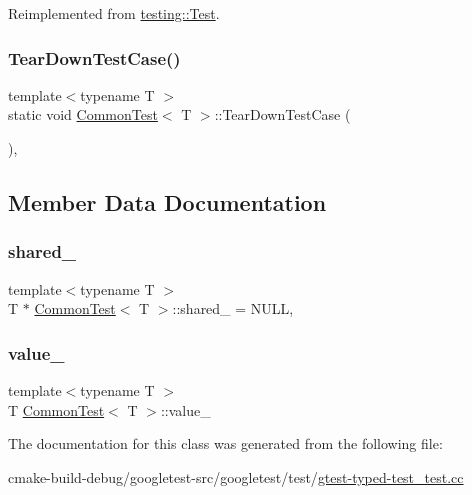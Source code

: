 Reimplemented from \mbox{\hyperlink{classtesting_1_1Test_a5f0ab439802cbe0ef7552f1a9f791923}{testing\+::\+Test}}.

\mbox{\label{classCommonTest_a68d2bf5108cf28478331588fbdff4838}} 
\subsubsection{\texorpdfstring{TearDownTestCase()}{TearDownTestCase()}}
{\footnotesize\ttfamily template$<$typename T $>$ \\
static void \mbox{\hyperlink{classCommonTest}{Common\+Test}}$<$ T $>$\+::Tear\+Down\+Test\+Case (\begin{DoxyParamCaption}{ }\end{DoxyParamCaption})\hspace{0.3cm}{\ttfamily [inline]}, {\ttfamily [static]}}



\subsection{Member Data Documentation}
\mbox{\label{classCommonTest_a52368ce1e65a865db9bdccbcc2cedaac}} 
\subsubsection{\texorpdfstring{shared\_}{shared\_}}
{\footnotesize\ttfamily template$<$typename T $>$ \\
T $\ast$ \mbox{\hyperlink{classCommonTest}{Common\+Test}}$<$ T $>$\+::shared\+\_\+ = N\+U\+LL\hspace{0.3cm}{\ttfamily [static]}, {\ttfamily [protected]}}

\mbox{\label{classCommonTest_ae59c4abcb833625a7baeb2048531ebec}} 
\subsubsection{\texorpdfstring{value\_}{value\_}}
{\footnotesize\ttfamily template$<$typename T $>$ \\
T \mbox{\hyperlink{classCommonTest}{Common\+Test}}$<$ T $>$\+::value\+\_\+\hspace{0.3cm}{\ttfamily [protected]}}



The documentation for this class was generated from the following file\+:\begin{DoxyCompactItemize}
\item 
cmake-\/build-\/debug/googletest-\/src/googletest/test/\mbox{\hyperlink{gtest-typed-test__test_8cc}{gtest-\/typed-\/test\+\_\+test.\+cc}}\end{DoxyCompactItemize}
